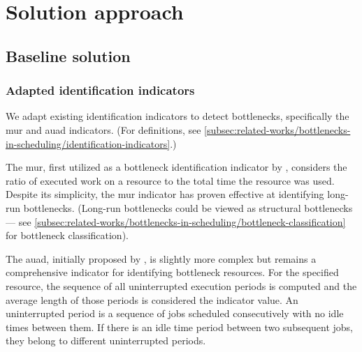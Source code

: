 \chapter{Solution approach} \label{chap:solution-apporach}


\section{Baseline solution} \label{sec:solution-apporach/baseline-solution}


\subsection{Adapted identification indicators}

We adapt existing identification indicators to detect bottlenecks,
specifically the \acf{mur} and \acf{auad} indicators.
(For definitions, see \cref{subsec:related-works/bottlenecks-in-scheduling/identification-indicators}.)
        
The \ac{mur}, first utilized as a bottleneck identification indicator by \citet{Lawrence1994},
considers the ratio of executed work on a resource to the total time the resource was used.
Despite its simplicity, the \ac{mur} indicator has proven effective at identifying long-run bottlenecks.
(Long-run bottlenecks could be viewed as structural bottlenecks ---
see \cref{subsec:related-works/bottlenecks-in-scheduling/bottleneck-classification} for bottleneck classification).

The \ac{auad}, initially proposed by \citet{Roser2001},
is slightly more complex but remains a comprehensive indicator for identifying bottleneck resources.
For the specified resource, the sequence of all uninterrupted execution periods is computed
and the average length of those periods is considered the indicator value.
An uninterrupted period is a sequence of jobs scheduled consecutively with no idle times between them.
If there is an idle time period between two subsequent jobs,
they belong to different uninterrupted periods.

